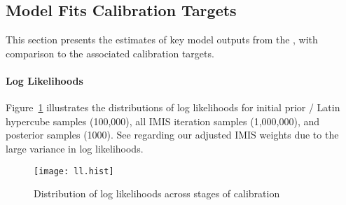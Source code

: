 \subsection{Model Fits \vs Calibration Targets}\label{sr.cal.targ}
This section presents the estimates of key model outputs from the \fffit,
with comparison to the associated calibration targets.
\paragraph{Log Likelihoods}
Figure~\ref{fig:ll.hist} illustrates the distributions of log likelihoods for
initial prior / Latin hypercube samples (100,000),
all IMIS iteration samples (1,000,000),
and posterior samples (1000).
See  regarding our adjusted IMIS weights
due to the large variance in log likelihoods.
\begin{figure}
  \centering\texttt{[image: ll.hist]}
  \caption{Distribution of log likelihoods across stages of calibration}
  \label{fig:ll.hist}
\end{figure}
\pagebreak %

